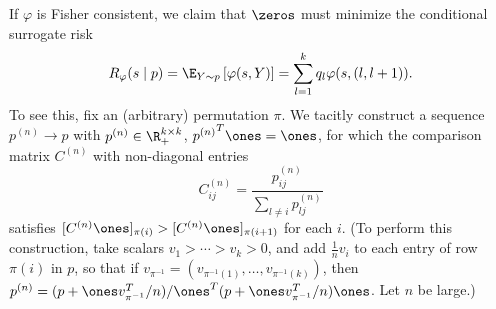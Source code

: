 \documentclass[11pt]{article}
\newcommand{\brk}[1]{\left[{#1}\right]} %
\newcommand{\sloss}{\varphi}  %
\newcommand{\sups}[1]{^{({#1})}} %
\begin{document}
If $\sloss$ is Fisher
consistent, we claim that $\zeros$ must minimize the conditional
surrogate risk
\begin{align}
  R_\sloss(s \mid p)
  = \E_{Y \sim p} \brk{\sloss(s, Y)} = \sum_{l=1}^k q_l \sloss(s, (l,l+1)).
  \label{eq:ranking-conditional-surrogate-risk}
\end{align}
To see this, fix an (arbitrary) permutation $\pi$.
%
We tacitly construct a sequence $p\sups{n} \to p$ with $p\sups{n} \in \R^{k
  \times k}_+$, ${p\sups{n}}^T \ones = \ones$,
for which the comparison matrix
$C\sups{n}$ with non-diagonal entries
\begin{equation*}
  C\sups{n}_{ij} = \frac{p\sups{n}_{ij}}{\sum_{l \neq i} p\sups{n}_{lj}}
\end{equation*}
satisfies $[C\sups{n}\ones]_{\pi(i)} > [C\sups{n}\ones]_{\pi(i + 1)}$ for
each $i$.
%
(To perform this construction, take scalars $v_1 > \cdots > v_k > 0$,
and add $\frac{1}{n} v_i$ to each entry of row $\pi(i)$ in $p$,
so that if $v_{\pi^{-1}} = (v_{\pi^{-1}(1)}, \ldots, v_{\pi^{-1}(k)})$,
then $p\sups{n} = (p + \ones v_{\pi^{-1}}^T / n) /
\ones^T (p + \ones v_{\pi^{-1}}^T / n) \ones$.
%
Let $n$ be large.)
\end{document}
